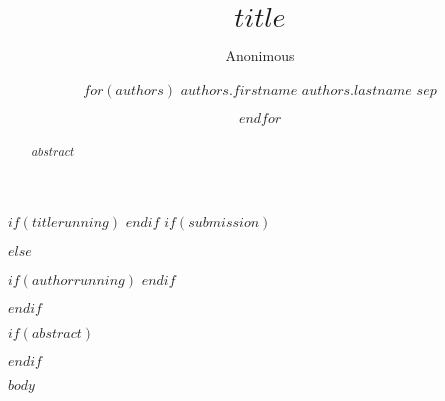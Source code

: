 \documentclass[runningheads]{llncs}
\begin{document}
%
\title{$title$}
%
$if(titlerunning)$  $endif$
%
$if(submission)$
\author{Anonimous}
$else$
\author{
$for(authors)$
$authors.firstname$ $authors.lastname$ $sep$\and
$endfor$
}
$if(authorrunning)$  $endif$

$endif$

%
\maketitle
%

$if(abstract)$\begin{abstract} $abstract$ \end{abstract}$endif$ 



$body$
%
%
%
% 

% 
%

%
\end{document}
